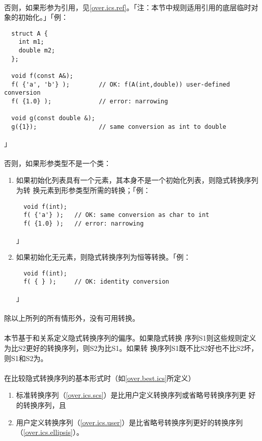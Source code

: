 \paragraph{}
否则，如果形参为引用，见\ref{over.ics.ref}。「注：本节中规则适用引用的底层临时对
象的初始化。」「例：
\begin{lstlisting}
  struct A {
    int m1;
    double m2;
  };

  void f(const A&);
  f( {'a', 'b'} );        // OK: f(A(int,double)) user-defined conversion
  f( {1.0} );             // error: narrowing

  void g(const double &);
  g({1});                 // same conversion as int to double
\end{lstlisting}」

\paragraph{}
否则，如果形参类型不是一个类：
\begin{enumerate}
  \item{如果初始化列表具有一个元素，其本身不是一个初始化列表，则隐式转换序列为转
    换元素到形参类型所需的转换；「例：
\begin{lstlisting}
  void f(int);
  f( {'a'} );   // OK: same conversion as char to int
  f( {1.0} );   // error: narrowing
\end{lstlisting}」}
  \item{如果初始化无元素，则隐式转换序列为恒等转换。「例：
\begin{lstlisting}
  void f(int);
  f( { } );     // OK: identity conversion
\end{lstlisting}」}
\end{enumerate}

\paragraph{}
除以上所列的所有情形外，没有可用转换。

\paragraph{}
本节基于和关系定义隐式转换序列的偏序。如果隐式转换
序列S1则这些规则定义为比S2更好的转换序列，则S2为比S1。如果转
换序列S1既不比S2好也不比S2坏，则S1和S2为。

\paragraph{}
在比较隐式转换序列的基本形式时（如\ref{over.best.ics}所定义）
\begin{enumerate}
  \item{标准转换序列（\ref{over.ics.scs}）是比用户定义转换序列或省略号转换序列更
    好的转换序列，且}
  \item{用户定义转换序列（\ref{over.ics.user}）是比省略号转换序列更好的转换序列
    （\ref{over.ics.ellipsis}）。}
\end{enumerate}

